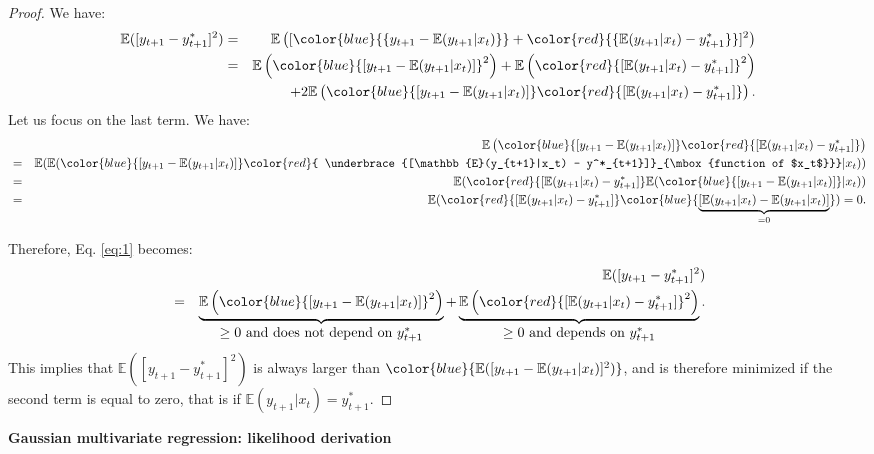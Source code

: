 \documentclass[
  11pt,
]{book}
\theoremstyle{definition}
\theoremstyle{definition}
\theoremstyle{definition}
\theoremstyle{definition}
\theoremstyle{remark}
\begin{document}
\begin{proof}
We have:
\begin{eqnarray}
\mathbb{E}([y_{t+1} - y^*_{t+1}]^2) &=& \mathbb{E}\left([\color{blue}{\{y_{t+1} - \mathbb{E}(y_{t+1}|x_t)\}} + \color{red}{\{\mathbb{E}(y_{t+1}|x_t)  - y^*_{t+1}\}}]^2\right)\nonumber\\
&=&  \mathbb{E}\left(\color{blue}{[y_{t+1} - \mathbb{E}(y_{t+1}|x_t)]}^2\right) + \mathbb{E}\left(\color{red}{[\mathbb{E}(y_{t+1}|x_t)  - y^*_{t+1}]}^2\right)\nonumber\\
&& + 2\mathbb{E}\left( \color{blue}{[y_{t+1} - \mathbb{E}(y_{t+1}|x_t)]}\color{red}{ [\mathbb{E}(y_{t+1}|x_t)  - y^*_{t+1}]}\right). \label{eq:1}
\end{eqnarray}
Let us focus on the last term. We have:
\begin{eqnarray*}
&&\mathbb{E}\left(\color{blue}{[y_{t+1} - \mathbb{E}(y_{t+1}|x_t)]}\color{red}{ [\mathbb{E}(y_{t+1}|x_t)  - y^*_{t+1}]}\right)\\
&=& \mathbb{E}( \mathbb{E}( \color{blue}{[y_{t+1} - \mathbb{E}(y_{t+1}|x_t)]}\color{red}{ \underbrace{[\mathbb{E}(y_{t+1}|x_t)  - y^*_{t+1}]}_{\mbox{function of $x_t$}}}|x_t))\\
&=& \mathbb{E}( \color{red}{ [\mathbb{E}(y_{t+1}|x_t)  - y^*_{t+1}]} \mathbb{E}( \color{blue}{[y_{t+1} - \mathbb{E}(y_{t+1}|x_t)]}|x_t))\\
&=& \mathbb{E}( \color{red}{ [\mathbb{E}(y_{t+1}|x_t)  - y^*_{t+1}]} \color{blue}{\underbrace{[\mathbb{E}(y_{t+1}|x_t) - \mathbb{E}(y_{t+1}|x_t)]}_{=0}})=0.
\end{eqnarray*}

Therefore, Eq. \eqref{eq:1} becomes:
\begin{eqnarray*}
&&\mathbb{E}([y_{t+1} - y^*_{t+1}]^2) \\
&=&  \underbrace{\mathbb{E}\left(\color{blue}{[y_{t+1} - \mathbb{E}(y_{t+1}|x_t)]}^2\right)}_{\mbox{$\ge 0$ and does not depend on $y^*_{t+1}$}} + \underbrace{\mathbb{E}\left(\color{red}{[\mathbb{E}(y_{t+1}|x_t)  - y^*_{t+1}]}^2\right)}_{\mbox{$\ge 0$ and depends on $y^*_{t+1}$}}.
\end{eqnarray*}
This implies that \(\mathbb{E}([y_{t+1} - y^*_{t+1}]^2)\) is always larger than \(\color{blue}{\mathbb{E}([y_{t+1} - \mathbb{E}(y_{t+1}|x_t)]^2)}\), and is therefore minimized if the second term is equal to zero, that is if \(\mathbb{E}(y_{t+1}|x_t) = y^*_{t+1}\).
\end{proof}

\textbf{Gaussian multivariate regression: likelihood derivation}
\end{document}

